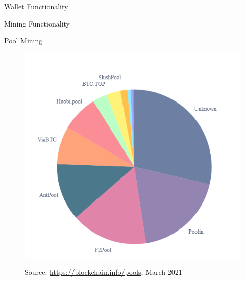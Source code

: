 \documentclass[handout]{beamer}
\begin{document}


\begin{frame}{Wallet Functionality}
	\centering
	\begin{tikzpicture}[scale=1, every node/.style={scale=1}]
		
	\end{tikzpicture}
\end{frame}

\begin{frame}{Mining Functionality}
	\centering
	\begin{tikzpicture}[scale=1, every node/.style={scale=1}]
		
	\end{tikzpicture}
\end{frame}

\begin{frame}{Pool Mining}
	\centering
	\begin{figure}[t]
		\includegraphics[height = 0.8\textheight]{../assets/images/mining_pools}
		
		Source: \link \url{https://blockchain.info/pools}, March 2021
	\end{figure}
\end{frame}
\end{document}
